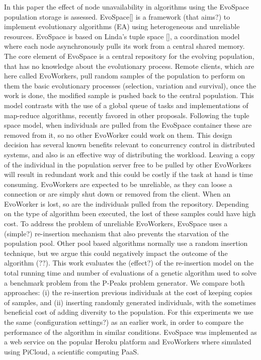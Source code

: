\documentclass{llncs}
\begin{document}
In this paper the effect of node unavailability in algorithms using the EvoSpace population storage is assessed. EvoSpace[] is a framework (that aims?) to implement evolutionary algorithms (EA) using heterogeneous and unreliable resources. EvoSpace is based on Linda's tuple space [], a coordination model where each node asynchronously pulls its work from a central shared memory. The core element of EvoSpace is a central repository for the evolving population, that has no knowledge about the evolutionary process. Remote clients, which are here called EvoWorkers, pull random samples of the population to perform on them the basic evolutionary processes (selection, variation and survival), once the work is done, the modified sample is pushed back to the central population. This model contrasts with  the use of a global queue of tasks and implementations of map-reduce algorithms, recently favored in other proposals. Following the tuple space model, when individuals are pulled from the EvoSpace container these are removed from it, so no other EvoWorker could work on them. This design decision has several known benefits relevant to concurrency control in distributed systems, and also is an effective way of distributing the workload. Leaving a copy of the individual in the population server free to be pulled by other EvoWorkers will result in redundant work and this could be costly if the task at hand is time consuming. EvoWorkers are expected to be unreliable, as they can loose a connection or are simply shut down or removed from the client. When an EvoWorker is lost, so are the individuals pulled from the repository. Depending on the type of algorithm been executed, the lost of these samples could have high cost. To address the problem of unreliable EvoWorkers, EvoSpace uses a (simple?) re-insertion mechanism that also prevents the starvation of the population pool. Other pool based algorithms normally use a random insertion technique, but we argue this could negatively impact the outcome of the algorithm (??). This work evaluates the (effect?) of the re-insertion model on the total running time and number of evaluations of a genetic algorithm used to solve a benchmark problem from the P-Peaks problem generator. We compare both approaches: (i) the re-insertion previous individuals at the cost of keeping copies of samples, and (ii) inserting  randomly generated individuals, with the sometimes beneficial cost of adding diversity to the population. For this experiments we use the same (configuration settings?) as an earlier work, in order to compare the performance of the algorithm in similar conditions.
EvoSpace was implemented as a web service on the popular Heroku platform and EvoWorkers where simulated using PiCloud, a scientific computing PaaS. 
\end{document}
